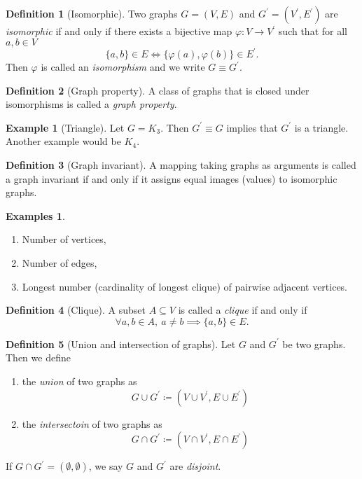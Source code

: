 \documentclass[a4paper]{article}
\theoremstyle{definition}\newtheorem*{defi*}{Definition}
\theoremstyle{remark}\newtheorem*{rem}{Remark}
\theoremstyle{plain}\newtheorem{lemma}[cnt]{Lemma}
\theoremstyle{definition}\newtheorem*{ex}{Example}
\theoremstyle{definition}\newtheorem*{exs}{Examples}
\theoremstyle{plain}\newtheorem{theorem}[cnt]{Theorem}
\theoremstyle{plain}\newtheorem{prop}[cnt]{Proposition}
\theoremstyle{plain}\newtheorem*{cor*}{Corollary}
\theoremstyle{definition}\newtheorem{nota}{Notation}
\theoremstyle{definition}\newtheorem*{nota*}{Notation}
\theoremstyle{plain}\newtheorem{conj}[cnt]{Conjecture}
\begin{document}
\begin{defi*}[Isomorphic]
  Two graphs $G= (V,E)$ and $G^\prime = (V^\prime,E^\prime)$ are \emph{isomorphic} if and only if there exists a bijective map $\varphi: V \to V^\prime$ such that for all $a,b \in V$ 
  \[ \{a,b\} \in E \iff \{ \varphi(a),\varphi(b)\} \in E^\prime \text{.} \]
  Then $\varphi$ is called an \emph{isomorphism} and we write $G \equiv G^\prime$.
\end{defi*}

\begin{defi*}[Graph property]
  A class of graphs that is closed under isomorphisms is called a \emph{graph property}.
\end{defi*}

\begin{ex}[Triangle]
  Let $G = K_3$. Then $G^\prime \equiv G$ implies that $G^\prime$ is a triangle.\\
  Another example would be $K_4$.
\end{ex}

\begin{defi*}[Graph invariant]
  A mapping taking graphs as arguments is called a graph invariant if and only if it assigns equal images (values) to isomorphic graphs.
\end{defi*}

\begin{exs}
  \begin{enumerate}
    \item Number of vertices,
    \item Number of edges,
    \item Longest number (cardinality of longest clique) of pairwise adjacent vertices.
  \end{enumerate}
\end{exs}

\begin{defi*}[Clique]
  A subset $A \subseteq V$ is called a \emph{clique} if and only if 
  \[ \forall a,b \in A, \: a \neq b \implies \{a,b\} \in E \text{.} \]
\end{defi*}

\begin{defi*}[Union and intersection of graphs]
  Let $G$ and $G^\prime$ be two graphs. Then we define
  \begin{enumerate}
    \item the \emph{union} of two graphs as
    \[ G \cup G^\prime \coloneqq (V \cup V^\prime, E \cup E^\prime) \]
    \item the \emph{intersectoin} of two graphs as
    \[ G \cap G^\prime \coloneqq (V \cap V^\prime, E \cap E^\prime) \]
  \end{enumerate}
  If $G \cap G^\prime = (\emptyset,\emptyset)$, we say $G$ and $G^\prime$ are \emph{disjoint}.
\end{defi*}
\end{document}
